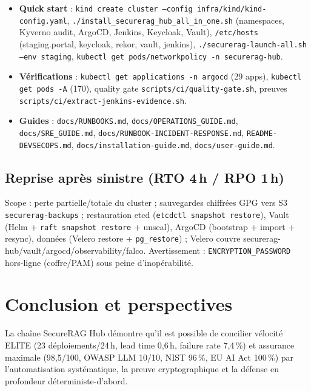 \documentclass[12pt,a4paper,openany]{report}
\begin{document}
\begin{itemize}
  \item \textbf{Quick start} : \texttt{kind create cluster --config infra/kind/kind-config.yaml},
  \texttt{./install\_securerag\_hub\_all\_in\_one.sh} (namespaces, Kyverno audit, ArgoCD, Jenkins, Keycloak, Vault),
  \texttt{/etc/hosts} (staging.portal, keycloak, rekor, vault, jenkins),
  \texttt{./securerag-launch-all.sh --env staging},
  \texttt{kubectl get pods/networkpolicy -n securerag-hub}.
  \item \textbf{Vérifications} : \texttt{kubectl get applications -n argocd} (29 apps),
  \texttt{kubectl get pods -A} (170), quality gate \texttt{scripts/ci/quality-gate.sh},
  preuves \texttt{scripts/ci/extract-jenkins-evidence.sh}.
  \item \textbf{Guides} : \texttt{docs/RUNBOOKS.md}, \texttt{docs/OPERATIONS\_GUIDE.md},
  \texttt{docs/SRE\_GUIDE.md}, \texttt{docs/RUNBOOK-INCIDENT-RESPONSE.md},
  \texttt{README-DEVSECOPS.md}, \texttt{docs/installation-guide.md}, \texttt{docs/user-guide.md}.
\end{itemize}

\section{Reprise après sinistre (RTO 4\,h / RPO 1\,h)}

Scope : perte partielle/totale du cluster ; sauvegardes chiffrées GPG vers S3
\texttt{securerag-backups} ; restauration etcd (\texttt{etcdctl snapshot restore}),
Vault (Helm + \texttt{raft snapshot restore} + unseal), ArgoCD (bootstrap + import + resync),
données (Velero restore + \texttt{pg\_restore}) ; Velero couvre securerag-hub/vault/argocd/observability/falco.
Avertissement : \texttt{ENCRYPTION\_PASSWORD} hors-ligne (coffre/PAM) sous peine d'inopérabilité.

\chapter{Conclusion et perspectives}
\label{ch:conclusion}

La chaîne SecureRAG Hub démontre qu'il est possible de concilier vélocité ELITE (23 déploiements/24\,h,
lead time 0,6\,h, failure rate 7,4\,\%) et assurance maximale (98,5/100, OWASP LLM 10/10,
NIST 96\,\%, EU AI Act 100\,\%) par l'automatisation systématique, la preuve cryptographique
et la défense en profondeur déterministe-d'abord.
\end{document}
